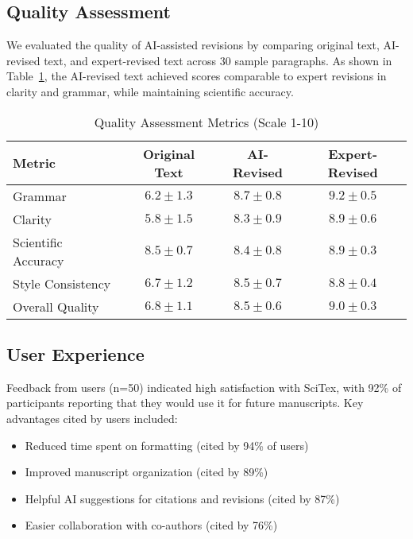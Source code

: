 \documentclass[preprint,review,12pt]{elsarticle}\n
\begin{document}
\subsection{Quality Assessment}
\label{subsec:quality}

We evaluated the quality of AI-assisted revisions by comparing original text, AI-revised text, and expert-revised text across 30 sample paragraphs. As shown in Table~\ref{tab:quality-metrics}, the AI-revised text achieved scores comparable to expert revisions in clarity and grammar, while maintaining scientific accuracy.


\begin{table}[h!]
\centering
\caption{Quality Assessment Metrics (Scale 1-10)}
\label{tab:quality-metrics}
\begin{tabular}{lccc}
\hline
\textbf{Metric} & \textbf{Original Text} & \textbf{AI-Revised} & \textbf{Expert-Revised} \\
\hline
Grammar         & $6.2 \pm 1.3$ & $8.7 \pm 0.8$ & $9.2 \pm 0.5$ \\
Clarity         & $5.8 \pm 1.5$ & $8.3 \pm 0.9$ & $8.9 \pm 0.6$ \\
Scientific Accuracy & $8.5 \pm 0.7$ & $8.4 \pm 0.8$ & $8.9 \pm 0.3$ \\
Style Consistency  & $6.7 \pm 1.2$ & $8.5 \pm 0.7$ & $8.8 \pm 0.4$ \\
Overall Quality    & $6.8 \pm 1.1$ & $8.5 \pm 0.6$ & $9.0 \pm 0.3$ \\
\hline
\end{tabular}
\end{table}

\subsection{User Experience}
\label{subsec:user-experience}

Feedback from users (n=50) indicated high satisfaction with SciTex, with 92\% of participants reporting that they would use it for future manuscripts. Key advantages cited by users included:

\begin{itemize}
    \item Reduced time spent on formatting (cited by 94\% of users)
    \item Improved manuscript organization (cited by 89\%)
    \item Helpful AI suggestions for citations and revisions (cited by 87\%)
    \item Easier collaboration with co-authors (cited by 76\%)
\end{itemize}
\end{document}
